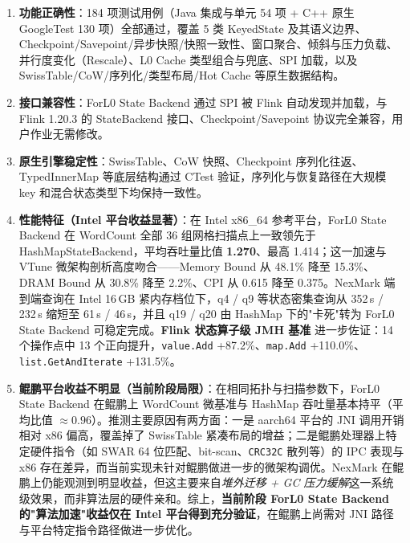 \documentclass[a4paper,11pt]{article}
\newcommand{\project}{ForL0 State Backend}
\begin{document}
\begin{enumerate}
  \item \textbf{功能正确性}：184 项测试用例（Java 集成与单元 54 项 + C++ 原生 GoogleTest 130 项）全部通过，覆盖 5 类 KeyedState 及其语义边界、Checkpoint/Savepoint/异步快照/快照一致性、窗口聚合、倾斜与压力负载、并行度变化（Rescale）、L0 Cache 类型组合与兜底、SPI 加载，以及 SwissTable/CoW/序列化/类型布局/Hot Cache 等原生数据结构。
  \item \textbf{接口兼容性}：\project{} 通过 SPI 被 Flink 自动发现并加载，与 Flink 1.20.3 的 StateBackend 接口、Checkpoint/Savepoint 协议完全兼容，用户作业无需修改。
  \item \textbf{原生引擎稳定性}：SwissTable、CoW 快照、Checkpoint 序列化往返、TypedInnerMap 等底层结构通过 CTest 验证，序列化与恢复路径在大规模 key 和混合状态类型下均保持一致性。
  \item \textbf{性能特征（Intel 平台收益显著）}：在 Intel x86\_64 参考平台，\project{} 在 WordCount 全部 36 组网格扫描点上一致领先于 HashMapStateBackend，平均吞吐量比值 \textbf{1.270}、最高 1.414；这一加速与 VTune 微架构剖析高度吻合——Memory Bound 从 48.1\% 降至 15.3\%、DRAM Bound 从 30.8\% 降至 2.2\%、CPI 从 0.615 降至 0.375。NexMark 端到端查询在 Intel 16\,GB 紧内存档位下，q4 / q9 等状态密集查询从 352\,s / 232\,s 缩短至 61\,s / 46\,s，并且 q19 / q20 由 HashMap 下的"卡死"转为 \project{} 可稳定完成。\textbf{Flink 状态算子级 JMH 基准} 进一步佐证：14 个操作点中 13 个正向提升，\texttt{value.Add} +87.2\%、\texttt{map.Add} +110.0\%、\texttt{list.GetAndIterate} +131.5\%。
  \item \textbf{鲲鹏平台收益不明显（当前阶段局限）}：在相同拓扑与扫描参数下，\project{} 在鲲鹏上 WordCount 微基准与 HashMap 吞吐量基本持平（平均比值 $\approx 0.96$）。推测主要原因有两方面：一是 aarch64 平台的 JNI 调用开销相对 x86 偏高，覆盖掉了 SwissTable 紧凑布局的增益；二是鲲鹏处理器上特定硬件指令（如 SWAR 64 位匹配、bit-scan、\texttt{CRC32C} 散列等）的 IPC 表现与 x86 存在差异，而当前实现未针对鲲鹏做进一步的微架构调优。NexMark 在鲲鹏上仍能观测到明显收益，但这主要来自\emph{堆外迁移 + GC 压力缓解}这一系统级效果，而非算法层的硬件亲和。综上，\textbf{当前阶段 \project{} 的"算法加速"收益仅在 Intel 平台得到充分验证}，在鲲鹏上尚需对 JNI 路径与平台特定指令路径做进一步优化。
\end{enumerate}
\end{document}
